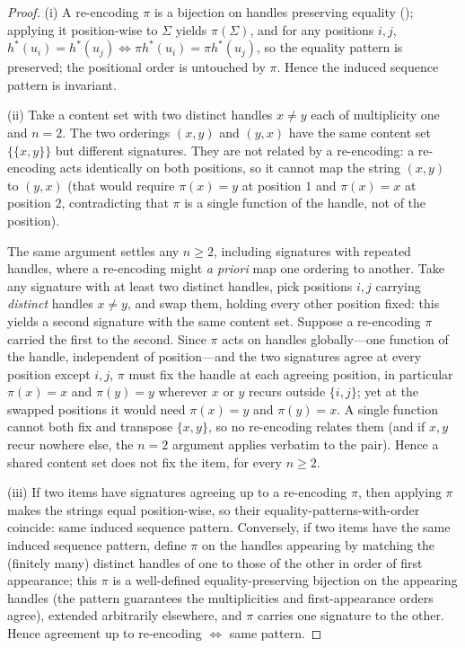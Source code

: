 \documentclass[11pt,twocolumn,a4paper]{article}
\theoremstyle{thmstyle}
\theoremstyle{definition}
\theoremstyle{remark}
\newcommand{\hand}{h}
\newcommand{\sig}{\Sigma}
\begin{document}
\begin{proof}
(i) A re-encoding $\pi$ is a bijection on handles preserving equality
(); applying it position-wise to $\sig$ yields $\pi(\sig)$,
and for any positions $i,j$, $\hand^{\ast}(u_i)=\hand^{\ast}(u_j)\iff
\pi\hand^{\ast}(u_i)=\pi\hand^{\ast}(u_j)$, so the equality pattern is preserved;
the positional order is untouched by $\pi$. Hence the induced sequence pattern is
invariant.

(ii) Take a content set with two distinct handles $x\neq y$ each of multiplicity
one and $n=2$. The two orderings $(x,y)$ and $(y,x)$ have the same content set
$\{\!\{x,y\}\!\}$ but different signatures. They are not related by a re-encoding:
a re-encoding acts identically on both positions, so it cannot map the string
$(x,y)$ to $(y,x)$ (that would require $\pi(x)=y$ at position $1$ and
$\pi(x)=x$ at position $2$, contradicting that $\pi$ is a single function of the
handle, not of the position).

The same argument settles any $n\ge2$, including signatures with repeated
handles, where a re-encoding might \emph{a priori} map one ordering to another.
Take any signature with at least two distinct handles, pick positions $i,j$
carrying \emph{distinct} handles $x\neq y$, and swap them, holding every other
position fixed: this yields a second signature with the same content set. Suppose
a re-encoding $\pi$ carried the first to the second. Since $\pi$ acts on handles
globally---one function of the handle, independent of position---and the two
signatures agree at every position except $i,j$, $\pi$ must fix the handle at
each agreeing position, in particular $\pi(x)=x$ and $\pi(y)=y$ wherever $x$ or
$y$ recurs outside $\{i,j\}$; yet at the swapped positions it would need
$\pi(x)=y$ and $\pi(y)=x$. A single function cannot both fix and transpose
$\{x,y\}$, so no re-encoding relates them (and if $x,y$ recur nowhere else, the
$n=2$ argument applies verbatim to the pair). Hence a shared content set does not
fix the item, for every $n\ge2$.

(iii) If two items have signatures agreeing up to a re-encoding $\pi$, then
applying $\pi$ makes the strings equal position-wise, so their
equality-patterns-with-order coincide: same induced sequence pattern.
Conversely, if two items have the same induced sequence pattern, define $\pi$ on
the handles appearing by matching the (finitely many) distinct handles of one to
those of the other in order of first appearance; this $\pi$ is a well-defined
equality-preserving bijection on the appearing handles (the pattern guarantees
the multiplicities and first-appearance orders agree), extended arbitrarily
elsewhere, and $\pi$ carries one signature to the other. Hence agreement up to
re-encoding $\iff$ same pattern.
\end{proof}
\end{document}
